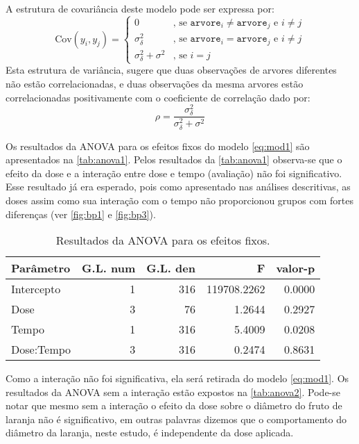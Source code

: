\documentclass[12pt,a4paper,final]{article}
\begin{document}
A estrutura de covariância deste modelo pode ser expressa por:
$$
\textrm{Cov}(y_{i}, y_{j}) =
\begin{cases}
0                     & \text{, se } \texttt{arvore}_{i} \neq \texttt{arvore}_j \text{ e } i \neq j\\
\sigma^2_\delta            & \text{, se } \texttt{arvore}_{i} = \texttt{arvore}_j \text{ e } i \neq j\\
\sigma^2_\delta + \sigma^2 & \text{, se } i = j
\end{cases}
$$
Esta estrutura de variância, sugere que duas observações de arvores
diferentes não estão correlacionadas, e duas observações da mesma
arvores estão correlacionadas positivamente com o coeficiente de
correlação dado por:
\begin{equation}\label{eq:rho}
\rho = \dfrac{\sigma^2_\delta}{\sigma^2_\delta + \sigma^2}
\end{equation}

Os resultados da ANOVA para os efeitos fixos do modelo \eqref{eq:mod1} são apresentados na \autoref{tab:anova1}.
Pelos resultados da \autoref{tab:anova1} observa-se que o efeito da dose e a interação entre dose e tempo (avaliação)
não foi significativo. Esse resultado já era esperado, pois como apresentado nas análises descritivas, as doses 
assim como sua interação com o tempo não proporcionou grupos com fortes diferenças (ver \autoref{fig:bp1} e 
\autoref{fig:bp3}).

\begin{table}[H]
	\centering
	\caption{Resultados da ANOVA para os efeitos fixos.}
	\onehalfspacing
	\label{tab:anova1}
	\begin{tabular}{lrrrr}\toprule
		Parâmetro& G.L. num  & G.L. den & F & valor-p \\ \midrule
Intercepto &     1 & 316 & 119708.2262 & 0.0000 \\ 
Dose &     3 & 76 & 1.2644 & 0.2927 \\ 
Tempo &     1 & 316 & 5.4009 & 0.0208 \\ 
Dose:Tempo &     3 & 316 & 0.2474 & 0.8631 \\ \bottomrule
	\end{tabular}
\end{table}

Como a interação não foi significativa, ela será retirada do modelo \eqref{eq:mod1}. Os resultados da ANOVA sem a 
interação estão expostos na \autoref{tab:anova2}. Pode-se notar que mesmo sem a interação o efeito da dose sobre
o diâmetro do fruto de laranja não é significativo, em outras palavras dizemos que o comportamento do diâmetro da laranja,
neste estudo, é independente da dose aplicada.
\end{document}

